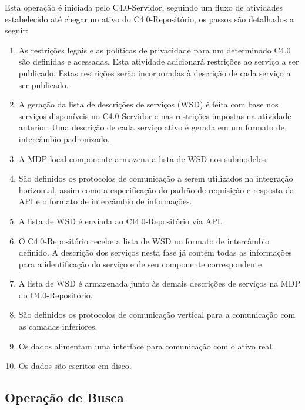 	Esta operação é iniciada pelo C4.0-Servidor, seguindo um fluxo de atividades estabelecido até chegar no ativo do C4.0-Repositório, os passos são detalhados a seguir:
	
	\begin{enumerate}
		
		\item As restrições legais e as políticas de privacidade para um determinado C4.0 são definidas e acessadas. Esta atividade adicionará restrições ao serviço a ser publicado. Estas restrições serão incorporadas à descrição de cada serviço a ser publicado.
		
		\item A geração da lista de descrições de serviços (WSD) é feita com base nos serviços disponíveis no C4.0-Servidor e nas restrições impostas na atividade anterior. Uma descrição de cada serviço ativo é gerada em um formato de intercâmbio padronizado.
		
		\item A MDP local componente armazena a lista de WSD nos submodelos.
		
		\item São definidos os protocolos de comunicação a serem utilizados na integração horizontal, assim como a especificação do padrão de requisição e resposta da API e o formato de intercâmbio de informações.
		
		\item A lista de WSD é enviada ao CI4.0-Repositório via API.
		
		\item O C4.0-Repositório recebe a lista de WSD no formato de intercâmbio definido. A descrição dos serviços nesta fase já contém todas as informações para a identificação do serviço e de seu componente correspondente.
		
		\item A lista de WSD é armazenada junto às demais descrições de serviços na MDP do C4.0-Repositório.
		
		\item São definidos os protocolos de comunicação vertical para a comunicação com as camadas inferiores.
		
		\item Os dados alimentam uma interface para comunicação com o ativo real.
		
		\item Os dados são escritos em disco.
	\end{enumerate}

\subsection{Operação de Busca}

